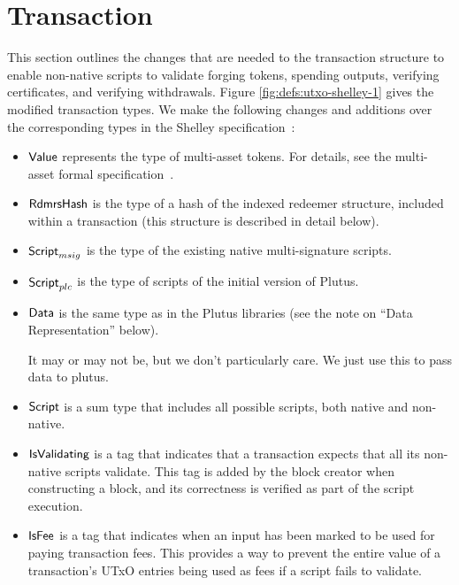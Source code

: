 \section{Transaction}
\label{sec:transactions}

This section outlines the changes that are needed to the transaction
structure to enable non-native scripts to validate
forging tokens, spending outputs, verifying certificates, and
verifying withdrawals.
%
Figure \ref{fig:defs:utxo-shelley-1} gives the modified transaction types.
We make the following changes and additions over the corresponding types in the
Shelley specification~\cite{XX}:

\begin{itemize}
  \item $\mathsf{Value}$ represents the type of multi-asset tokens. For details,
  see the multi-asset formal specification~\cite{XX}.

  \item $\mathsf{RdmrsHash}$ is the type of a hash of the indexed redeemer structure,
  included within a transaction (this structure is described in detail below).

  \item $\mathsf{Script}_{msig}$ is the type of the existing native multi-signature scripts.

  \item $\mathsf{Script}_{plc}$ is the type of scripts of the initial version of Plutus.

  \item $\mathsf{Data}$ is the same type as in the Plutus libraries (see the note on ``Data Representation'' below).
    \begin{note}
      It may or may not be, but we don't particularly care. We just use this to pass data to plutus.
    \end{note}

  \item $\mathsf{Script}$ is a sum type that includes all possible scripts, both native and non-native.

  \item $\mathsf{IsValidating}$ is a tag that indicates that a transaction
  expects that all its non-native scripts validate.
  This tag is added by the block creator when
  constructing a block, and its correctness is verified as part of the script execution.

  \item $\mathsf{IsFee}$ is a tag that indicates when an input has been marked
    to be used for paying transaction fees.
    This provides a way to prevent
  the entire value of a transaction's UTxO entries being used as fees if a script fails to validate.


\end{itemize}
